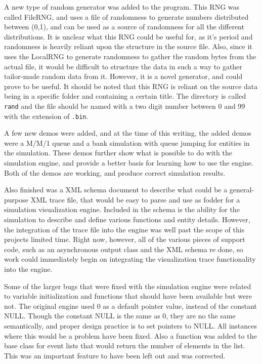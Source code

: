 \documentclass[12pt]{report}
\begin{document}
	A new type of random generator was added to the program.  This RNG was called FileRNG, and uses a file of randomness to generate numbers distributed between (0,1), and can be used as a source of randomness for all the different distributions.  It is unclear what this RNG could be useful for, as it's period and randomness is heavily reliant upon the structure in the source file.  Also, since it uses the LocalRNG to generate randomness to gather the random bytes from the actual file, it would be difficult to structure the data in such a way to gather tailor-made random data from it.  However, it is a novel generator, and could prove to be useful.  It should be noted that this RNG is reliant on the source data being in a specific folder and containing a certain title.  The directory is called \texttt{rand} and the file should be named with a two digit number between 0 and 99 with the extension of \texttt{.bin}.

	A few new demos were added, and at the time of this writing, the added demos were a M/M/1 queue and a bank simulation with queue jumping for entities in the simulation.  These demos further show what is possible to do with the simulation engine, and provide a better basis for learning how to use the engine.  Both of the demos are working, and produce correct simulation results.

	Also finished was a XML schema document to describe what could be a general-purpose XML trace file, that would be easy to parse and use as fodder for a simulation visualization engine.  Included in the schema is the ability for the simulation to describe and define various functions and entity details.  However, the integration of the trace file into the engine was well past the scope of this projects limited time.  Right now, however, all of the various pieces of support code, such as an asynchronous output class and the XML schema re done, so work could immediately begin on integrating the visualization trace functionality into the engine.

	Some of the larger bugs that were fixed with the simulation engine were related to variable initialization and functions that should have been available but were not.  The original engine used 0 as a default pointer value, instead of the constant NULL.  Though the constant NULL is the same as 0, they are no the same semantically, and proper design practice is to set pointers to NULL.  All instances where this would be a problem have been fixed.  Also a function was added to the base class for event lists that would return the number of elements in the list.  This was an important feature to have been left out and was corrected.
\end{document}
